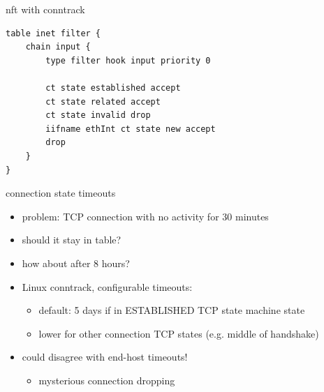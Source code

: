 \begin{frame}[fragile]{nft with conntrack}
\begin{Verbatim}
table inet filter {
    chain input {
        type filter hook input priority 0

        ct state established accept
        ct state related accept
        ct state invalid drop
        iifname ethInt ct state new accept
        drop
    }
}
\end{Verbatim}
\end{frame}

\begin{frame}{connection state timeouts}
    \begin{itemize}
    \item problem: TCP connection with no activity for 30 minutes
    \item should it stay in table?
    \item how about after 8 hours?
    \vspace{.5cm}
    \item Linux conntrack, configurable timeouts:
        \begin{itemize}
        \item default: 5 days if in ESTABLISHED TCP state machine state
        \item lower for other connection TCP states (e.g. middle of handshake)
        \end{itemize}
    \item could disagree with end-host timeouts!
        \begin{itemize}
        \item mysterious connection dropping
        \end{itemize}
    \end{itemize}
\end{frame}

